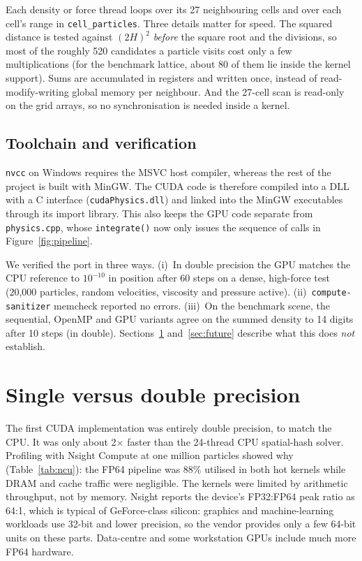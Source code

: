 \documentclass[11pt]{article}
\begin{document}
Each density or force thread loops over its 27 neighbouring cells and over each cell's range in \texttt{cell\_particles}. Three details matter for speed. The squared distance is tested against $(2H)^2$ \emph{before} the square root and the divisions, so most of the roughly 520 candidates a particle visits cost only a few multiplications (for the benchmark lattice, about 80 of them lie inside the kernel support). Sums are accumulated in registers and written once, instead of read-modify-writing global memory per neighbour. And the 27-cell scan is read-only on the grid arrays, so no synchronisation is needed inside a kernel.

\subsection{Toolchain and verification}\label{sec:verify}

\texttt{nvcc} on Windows requires the MSVC host compiler, whereas the rest of the project is built with MinGW. The CUDA code is therefore compiled into a DLL with a C interface (\texttt{cudaPhysics.dll}) and linked into the MinGW executables through its import library. This also keeps the GPU code separate from \texttt{physics.cpp}, whose \texttt{integrate()} now only issues the sequence of calls in Figure~\ref{fig:pipeline}.

We verified the port in three ways. (i)~In double precision the GPU matches the CPU reference to $10^{-10}$ in position after 60 steps on a dense, high-force test (20,000 particles, random velocities, viscosity and pressure active). (ii)~\texttt{compute-sanitizer} memcheck reported no errors. (iii)~On the benchmark scene, the sequential, OpenMP and GPU variants agree on the summed density to 14 digits after 10 steps (in double). Sections~\ref{sec:precision} and~\ref{sec:future} describe what this does \emph{not} establish.

\section{Single versus double precision}\label{sec:precision}

The first CUDA implementation was entirely double precision, to match the CPU. It was only about 2$\times$ faster than the 24-thread CPU spatial-hash solver. Profiling with Nsight Compute at one million particles showed why (Table~\ref{tab:ncu}): the FP64 pipeline was 88\% utilised in both hot kernels while DRAM and cache traffic were negligible. The kernels were limited by arithmetic throughput, not by memory. Nsight reports the device's FP32:FP64 peak ratio as 64:1, which is typical of GeForce-class silicon: graphics and machine-learning workloads use 32-bit and lower precision, so the vendor provides only a few 64-bit units on these parts. Data-centre and some workstation GPUs include much more FP64 hardware.
\end{document}
